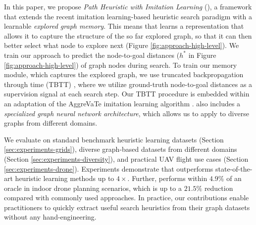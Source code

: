 

In this paper, we propose \textit{Path Heuristic with Imitation Learning} (\phil), a framework that extends the recent imitation learning-based heuristic search paradigm with a learnable \textit{explored graph memory}. This means that \phil learns a representation that allows it to capture the structure of the so far explored graph, so that it can then better select what node to explore next (Figure \ref{fig:approach-high-level}).  We train our approach to predict the node-to-goal distances ($h^{*}$ in Figure \ref{fig:approach-high-level}) of graph nodes during search. To train our memory module, which captures the explored graph, we use truncated backpropagation through time (TBTT) \cite{sutskever2013training}, where we utilize ground-truth node-to-goal distances as a supervision signal at each search step. Our TBTT procedure is embedded within an adaptation of the AggreVaTe imitation learning algorithm \cite{ross2014reinforcement}. \phil also includes a \textit{specialized graph neural network architecture}, which allows us to apply \phil to diverse graphs from different domains.



We evaluate \phil on standard benchmark heuristic learning datasets (Section \ref{sec:experiments-grids}), diverse graph-based datasets from different domains (Section \ref{sec:experiments-diversity}), and practical UAV flight use cases (Section \ref{sec:experiments-drone}). Experiments demonstrate that \phil outperforms state-of-the-art heuristic learning methods up to $4 \times$. Further, \phil performs within $4.9 \%$ of an oracle in indoor drone planning scenarios, which is up to a $21.5 \%$ reduction compared with commonly used approaches. In practice, our contributions enable practitioners to quickly extract useful search heuristics from their graph datasets without any hand-engineering.